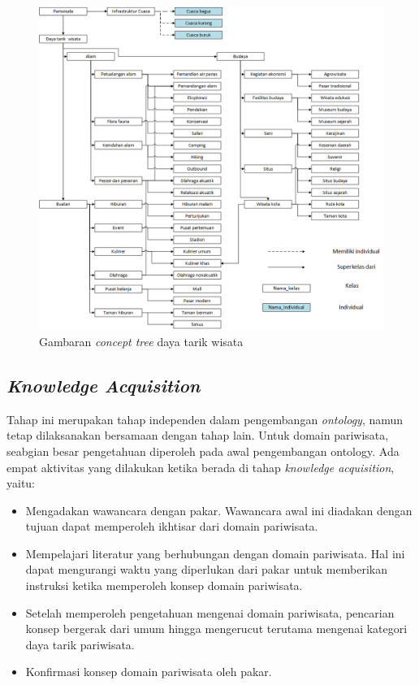 \begin{figure}[h!]
    \centering
    \includegraphics[scale=0.5]{img/concept-tree.png}
    \caption{Gambaran \textit{concept tree} daya tarik wisata}
    \label{fig:concept-tree}
\end{figure}
\cleardoublepage
\subsection{\textit{Knowledge Acquisition}}
\par
Tahap ini merupakan tahap independen dalam pengembangan \textit{ontology}, namun tetap dilaksanakan bersamaan dengan tahap lain.
Untuk domain pariwisata, seabgian besar pengetahuan diperoleh pada awal pengembangan ontology. Ada empat aktivitas yang dilakukan
ketika berada di tahap \textit{knowledge acquisition}, yaitu:
\begin{itemize}
\item Mengadakan wawancara dengan pakar. Wawancara awal ini diadakan dengan tujuan dapat memperoleh ikhtisar dari domain pariwisata.	 
\item Mempelajari literatur yang berhubungan dengan domain pariwisata. Hal ini dapat mengurangi waktu yang diperlukan
dari pakar untuk memberikan instruksi ketika memperoleh konsep domain pariwisata.
\item Setelah memperoleh pengetahuan mengenai domain pariwisata, pencarian konsep bergerak dari umum hingga mengerucut
terutama mengenai kategori daya tarik pariwisata.
\item Konfirmasi konsep domain pariwisata oleh pakar.
\end{itemize}


